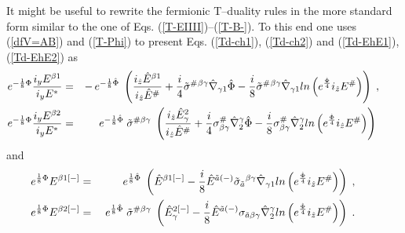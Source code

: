\documentclass[a4paper,11pt]{article}
\begin{document}
It might be  useful to rewrite the fermionic T--duality rules 
in the more standard form similar to the one of Eqs. 
(\ref{T-EIIII})--(\ref{T-B-}). 
To this end one uses (\ref{dfV=AB})  and (\ref{T-Phi}) to 
present Eqs. (\ref{Td-ch1}), (\ref{Td-ch2})  and 
(\ref{Td-EhE1}), (\ref{Td-EhE2}) as 
\begin{eqnarray}\label{Td-ch1-}
e^{-{1\over 8}{\Phi}} 
{i_{y}{E}^{{\beta}1} \over i_yE^*} 
&=& - \,  e^{-{1\over 8}\hat{\Phi}}\; 
\left(
{i_{\hat{z}}\hat{E}^{ {{\beta}1}}\over i_{\hat{z}}\hat{E}^{ {\#}}} 
+ {i \over 4} 
\tilde{\sigma}^{ {\#}}{}^{ {\beta} {\gamma}}
\hat{\nabla}_{ {\gamma}1}\hat{\Phi}- {i \over 8} 
\tilde{\sigma}^{ {\#}}{}^{ {\beta} {\gamma}}
\hat{\nabla}_{ {\gamma}1} ln \left(e^{\hat{\Phi}\over 4} i_{\hat{z}}E^{\#}
\right)\right) \; , \qquad \\  
\label{Td-ch2-}
e^{-{1\over 8}{\Phi}} 
{i_y{E}^{ {\beta}2}\over i_yE^*} &=&
\; e^{- {1\over 8}\hat{\Phi}}\;  
\tilde{\sigma}^{ {\#} {\beta} {\gamma}}
\; \left( {i_{\hat{z}}\hat{E}_{ {\gamma}}^2 \over i_{\hat{z}}\hat{E}^{ {\#}}} 
+ {i \over 4}  
{\sigma}^{\#}_{ {\beta} {\gamma}}
\hat{\nabla}^{ {\gamma}}_2\hat{\Phi} - 
{i \over 8}  
{\sigma}^{\#}_{ {\beta} {\gamma}}
\hat{\nabla}^{ {\gamma}}_2
ln \left({e^{\hat{\Phi}\over 4}} i_{\hat{z}}E^{\#}\right)
\right) \;   \qquad 
\end{eqnarray}
and
\begin{eqnarray}\label{Td-EhE1-}
e^{{1\over 8}{\Phi}} 
{E}^{ {\beta}1[-]} 
&=& \;  e^{{1\over 8}\hat{\Phi}}\; 
\left(\hat{E}^{{\beta}1[-]} - {i \over 8} \hat{E}^{ {\tilde{a}}(-)}
\tilde{\sigma}_{ {\tilde{a}}}{}^{ {\beta} {\gamma}}
\hat{\nabla}_{ {\gamma}1} ln \left({e^{\hat{\Phi}\over 4}} i_{\hat{z}}E^{\#}
\right)
\right)
\; , \qquad \\  
\label{Td-EhE2-} 
e^{{1\over 8}{\Phi}} 
{E}^{ {\beta}2[-]}
&=& \; e^{{1\over 8}\hat{\Phi}}\;  
\tilde{\sigma}^{ {\#} {\beta} {\gamma}}
\; \left( \hat{E}_{ {\gamma}}^{2[-]}  - {i \over 8}  
\hat{E}^{{\tilde{a}}(-)}
{\sigma}_{\tilde{ {a}} {\beta} {\gamma}}
\hat{\nabla}^{ {\gamma}}_2
ln \left({e^{\hat{\Phi}\over 4}} i_{\hat{z}}E^{\#}\right)\right)
\; . \qquad 
\end{eqnarray}
\end{document}
